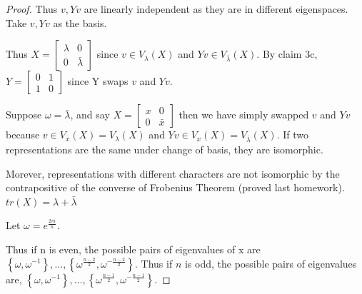 \documentclass{article}
\begin{document}
\begin{proof}
    Thus $v, Yv$ are linearly independent as they are in different eigenspaces. Take $v, Yv$ as the basis. 

    Thus $X = \begin{bmatrix}
        \lambda & 0 \\ 0 & \bar{\lambda}
    \end{bmatrix}$ since $v \in V_\lambda(X)$ and $Yv \in V_{\bar{\lambda}}(X)$. By claim 3c, $Y = \begin{bmatrix}
        0 & 1 \\ 1 & 0
    \end{bmatrix}$ since Y swaps $v$ and $Yv$.

    Suppose $\omega = \bar{\lambda}$, and say $X = \begin{bmatrix}
        x & 0 \\ 0 & \bar{x}
    \end{bmatrix}$ then we have simply swapped $v$ and $Yv$ because $v \in V_{\bar{x}}(X) = V_{\lambda}(X)$ and $Yv \in V_{x}(X) = V_{\bar{\lambda}}(X)$. If two representations are the same under change of basis, they are isomorphic. 

    Morever, representations with different characters are not isomorphic by the contrapositive of the converse of Frobenius Theorem (proved last homework). $tr(X) = \lambda + \bar{\lambda}$
    
    Let $\omega = e^{\frac{2\pi i}{n}}$.

    Thus if n is even, the possible pairs of eigenvalues of x are $\left\{ \omega, \omega^{-1} \right\}, \dots, \left\{ \omega^{\frac{n - 2}{2}}, \omega^{-\frac{n - 2}{2}} \right\}$. Thus if $n$ is odd, the possible pairs of eigenvalues are, $\left\{ \omega, \omega^{-1} \right\}, \dots, \left\{ \omega^{\frac{n - 1}{2}}, \omega^{-\frac{n - 1}{2}} \right\}$.

    




        

\end{proof}
\end{document}
